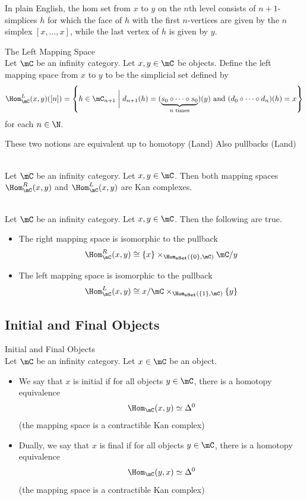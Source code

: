 \documentclass[a4paper]{article}
\begin{document}
In plain English, the hom set from $x$ to $y$ on the $n$th level consists of $n+1$-simplices $h$ for which the face of $h$ with the first $n$-vertices are given by the $n$ simplex $[x,\dots,x]$, while the last vertex of $h$ is given by $y$. 

\begin{defn}{The Left Mapping Space}{}\\ Let $\mC$ be an infinity category. Let $x,y\in\mC$ be objects. Define the left mapping space from $x$ to $y$ to be the simplicial set defined by $$\Hom_\mC^L(x,y)([n])=\left\{h\in\mC_{n+1}\;\bigg{|}\;d_{n+1}(h)=(\underbrace{s_0\circ\cdots\circ s_0}_{n\text{ times}})(y)\text{ and }(d_0\circ\cdots\circ d_n)(h)=x\right\}$$ for each $n\in\N$. 
\end{defn}

These two notions are equivalent up to homotopy (Land) Also pullbacks (Land)

\begin{prp}{}{}\\ Let $\mC$ be an infinity category. Let $x,y\in\mC$. Then both mapping spaces $\Hom_\mC^R(x,y)$ and $\Hom_\mC^L(x,y)$ are Kan complexes. 
\end{prp}

\begin{prp}{}{}\\ Let $\mC$ be an infinity category. Let $x,y\in\mC$. Then the following are true. 
\begin{itemize}
\item The right mapping space is isomorphic to the pullback $$\Hom_\mC^R(x,y)\cong\{x\}\times_{\Hom_\bold{sSet}(\{0\},\mC)}\mC/y$$
\item The left mapping space is isomorphic to the pullback $$\Hom_\mC^L(x,y)\cong x/\mC\times_{\Hom_\bold{sSet}(\{1\},\mC)}\{y\}$$
\end{itemize}
\end{prp}

\subsection{Initial and Final Objects}
\begin{defn}{Initial and Final Objects}{}\\ Let $\mC$ be an infinity category. Let $x\in\mC$ be an object. 
\begin{itemize}
\item We say that $x$ is initial if for all objects $y\in\mC$, there is a homotopy equivalence $$\Hom_\mC(x,y)\simeq\Delta^0$$ (the mapping space is a contractible Kan complex)
\item Dually, we say that $x$ is final if for all objects $y\in\mC$, there is a homotopy equivalence $$\Hom_\mC(y,x)\simeq\Delta^0$$ (the mapping space is a contractible Kan complex)
\end{itemize}
\end{defn}
\end{document}
